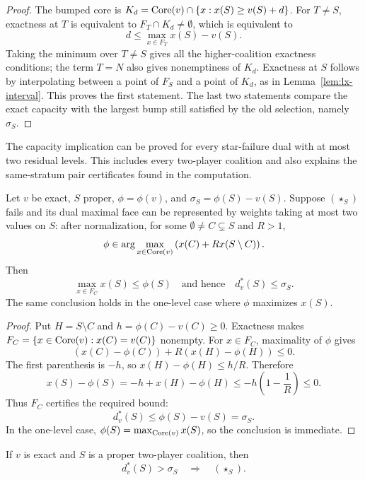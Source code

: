 \begin{proof}
The bumped core is
$K_d=\operatorname{Core}(v)\cap\{x:x(S)\geq v(S)+d\}$. For $T\neq S$, exactness at
$T$ is equivalent to $F_T\cap K_d\neq\emptyset$, which is equivalent to
\[
 d\leq \max_{x\in F_T}x(S)-v(S).
\]
Taking the minimum over $T\neq S$ gives all the higher-coalition exactness
conditions; the term $T=N$ also gives nonemptiness of $K_d$. Exactness at
$S$ follows by interpolating between a point of $F_S$ and a point of $K_d$,
as in Lemma~\ref{lem:lx-interval}. This proves the first statement. The
last two statements compare the exact capacity with the largest bump still
satisfied by the old selection, namely $\sigma_S$.
\end{proof}

The capacity implication can be proved for every star-failure dual with at
most two residual levels.  This includes every two-player coalition and also
explains the same-stratum pair certificates found in the computation.

\begin{proposition}
\label{prop:lx-two-level-capacity}
Let $v$ be exact, $S$ proper, $\phi=\phi(v)$, and
$\sigma_S=\phi(S)-v(S)$.  Suppose $(\star_S)$ fails and its dual maximal
face can be represented by weights taking at most two values on $S$: after
normalization, for some $\emptyset\neq C\subsetneq S$ and $R>1$,
\[
 \phi\in\arg\max_{x\in\operatorname{Core}(v)}
 \left(x(C)+R x(S\setminus C)\right).
\]
Then
\[
 \max_{x\in F_C}x(S)\leq\phi(S)
 \quad\text{and hence}\quad
 d_v^*(S)\leq\sigma_S.
\]
The same conclusion holds in the one-level case where $\phi$ maximizes
$x(S)$.
\end{proposition}

\begin{proof}
Put $H=S\setminus C$ and $h=\phi(C)-v(C)\geq0$.  Exactness makes
$F_C=\{x\in\operatorname{Core}(v):x(C)=v(C)\}$ nonempty.  For $x\in F_C$, maximality
of $\phi$ gives
\[
 (x(C)-\phi(C))+R(x(H)-\phi(H))\leq0.
\]
The first parenthesis is $-h$, so
$x(H)-\phi(H)\leq h/R$.  Therefore
\[
 x(S)-\phi(S)
 =-h+x(H)-\phi(H)
 \leq-h\left(1-\frac1R\right)\leq0.
\]
Thus $F_C$ certifies the required bound:
\[
 d_v^*(S)\leq\phi(S)-v(S)=\sigma_S.
\]
In the one-level case, $\phi(S)=\max_{\operatorname{Core}(v)}x(S)$, so the conclusion is
immediate.
\end{proof}

\begin{corollary}
\label{prop:lx-pair-capacity}
If $v$ is exact and $S$ is a proper two-player coalition, then
\[
 d_v^*(S)>\sigma_S\quad\Longrightarrow\quad(\star_S).
\]
\end{corollary}

